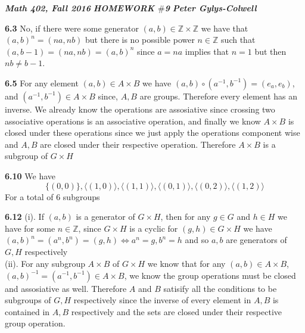 \documentclass[12pt]{article}
\newenvironment{ques}{\vspace{2 ex}}{\vspace{2 ex}}
\theoremstyle{definition}
\begin{document}
\noindent \textit{\textbf{Math 402, Fall 2016}} \hspace{1.3cm}
\textit{\textbf{HOMEWORK $\#$9}} \hspace{1.3cm} \textit{\textbf{Peter
Gylys-Colwell}} 

\vspace{1cm}

\begin{ques}
	\textbf{6.3}
		No, if there were some generator $(a, b) \in \mathbb{Z} \times
		\mathbb{Z}$ we have that $(a, b)^n = (na, nb)$ but there is no
		possible power $n \in \mathbb{Z}$ such that $(a, b-1) = (na,
		nb) = (a, b)^n$ since $a = na$ implies that $n = 1$ but then
		$nb \neq b - 1$.
\end{ques}

\begin{ques}
	\textbf{6.5}
		For any element $(a, b) \in A \times B$ we have $(a, b) \circ
		(a^{-1}, b^{-1}) = (e_a, e_b)$, and $(a^{-1}, b^{-1}) \in A
		\times B$ since, $A, B$ are groups. Therefore every element has
		an inverse. We already know the operations are assosiative
		since crossing two associative operations is an associative
		operation, and
		finally we know $A \times B$ is closed under these operations
		since we just apply the operations component wise and $A, B$
		are closed under their respective operation. Therefore $A
		\times B$ is a subgroup of $G \times H$
\end{ques}

\begin{ques}
	\textbf{6.10}
		We have
		$$\{(0,0)\}, \langle (1, 0) \rangle, \langle (1, 1) \rangle, \langle (0,
		1) \rangle, \langle (0, 2) \rangle, \langle (1, 2) \rangle$$
		For a total of $6$ subgroups
\end{ques}

\begin{ques}
	\textbf{6.12}
		(i). If $(a, b)$ is a generator of $G \times H$, then for any
		$g \in G$ and $h \in H$ we have for some $n \in \mathbb Z$,
		since $G \times H$ is a cyclic for $(g,h) \in G \times H$ we have
		$(a, b)^n = (a^n, b^n) = (g,h) \Leftrightarrow a^n = g, b^n =
		h$ and so $a, b$ are generators of $G, H$ respectively\\
		(ii). For any subgroup $A \times B$ of $G \times H$ we know
		that for any $(a, b) \in A \times B$, $(a, b)^{-1} = (a^{-1},
		b^{-1}) \in A \times B$, we know the group operations
		must be closed and assosiative as well. Therefore $A$ and $B$
		satisify all the conditions to be subgroups of $G, H$
		respectively since the inverse of every element in $A, B$ is
		contained in $A, B$ respectively and the sets are closed under
		their respective group operation.
\end{ques}
\end{document}
